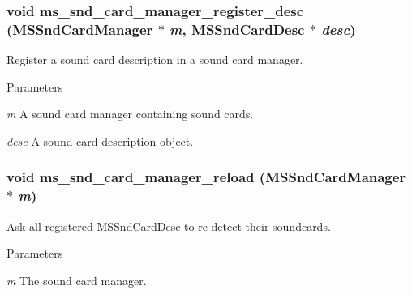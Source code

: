 \subsubsection[{ms\_\-snd\_\-card\_\-manager\_\-register\_\-desc}]{\setlength{\rightskip}{0pt plus 5cm}void ms\_\-snd\_\-card\_\-manager\_\-register\_\-desc ({\bf MSSndCardManager} $\ast$ {\em m}, \/  {\bf MSSndCardDesc} $\ast$ {\em desc})}\label{group__mediastreamer2__soundcardmanager_ga7150e34a175c0cf3464a45d439f4ae88}
Register a sound card description in a sound card manager.


\begin{DoxyParams}{Parameters}
\item[{\em m}]A sound card manager containing sound cards. \item[{\em desc}]A sound card description object. \end{DoxyParams}
\subsubsection[{ms\_\-snd\_\-card\_\-manager\_\-reload}]{\setlength{\rightskip}{0pt plus 5cm}void ms\_\-snd\_\-card\_\-manager\_\-reload ({\bf MSSndCardManager} $\ast$ {\em m})}\label{group__mediastreamer2__soundcardmanager_ga9c323efa5db417b97231fe9f293ee463}
Ask all registered MSSndCardDesc to re-\/detect their soundcards. 
\begin{DoxyParams}{Parameters}
\item[{\em m}]The sound card manager. \end{DoxyParams}
